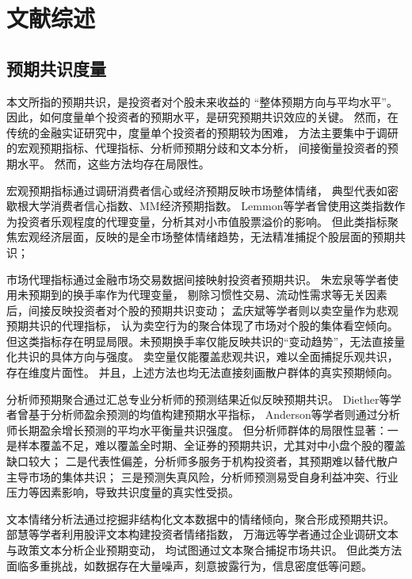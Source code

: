 
\chapter{文献综述}

\section{预期共识度量}
本文所指的预期共识，是投资者对个股未来收益的 “整体预期方向与平均水平”。
因此，如何度量单个投资者的预期水平，是研究预期共识效应的关键。
然而，在传统的金融实证研究中，度量单个投资者的预期较为困难，
方法主要集中于调研的宏观预期指标、代理指标、分析师预期分歧和文本分析\cite{唐国豪2025投资者预期协同}，
间接衡量投资者的预期水平。
然而，这些方法均存在局限性。

宏观预期指标通过调研消费者信心或经济预期反映市场整体情绪，
典型代表如密歇根大学消费者信心指数、MM经济预期指数。
Lemmon等学者曾使用这类指数作为投资者乐观程度的代理变量\cite{lemmon2006consumer}，分析其对小市值股票溢价的影响。
但此类指标聚焦宏观经济层面，反映的是全市场整体情绪趋势，无法精准捕捉个股层面的预期共识；

市场代理指标通过金融市场交易数据间接映射投资者预期共识。
朱宏泉等学者\cite{朱宏泉2016异质信念}使用未预期到的换手率作为代理变量，
剔除习惯性交易、流动性需求等无关因素后，间接反映投资者对个股的预期共识变动；
孟庆斌等学者\cite{孟庆斌2018卖空机制}则以卖空量作为悲观预期共识的代理指标，
认为卖空行为的聚合体现了市场对个股的集体看空倾向。
但这类指标存在明显局限。未预期换手率仅能反映共识的“变动趋势”，无法直接量化共识的具体方向与强度。
卖空量仅能覆盖悲观共识，难以全面捕捉乐观共识，存在维度片面性。
并且，上述方法也均无法直接刻画散户群体的真实预期倾向。

分析师预期聚合通过汇总专业分析师的预测结果近似反映预期共识。
Diether等学者曾基于分析师盈余预测的均值构建预期水平指标\cite{diether2002differences}，
Anderson等学者则通过分析师长期盈余增长预测的平均水平衡量共识强度\cite{anderson2005heterogeneous}。
但分析师群体的局限性显著：一是样本覆盖不足，难以覆盖全时期、全证券的预期共识，尤其对中小盘个股的覆盖缺口较大；
二是代表性偏差，分析师多服务于机构投资者，其预期难以替代散户主导市场的集体共识；
三是预测失真风险，分析师预测易受自身利益冲突、行业压力等因素影响\cite{伍燕然2012分析师预测偏差}，导致共识度量的真实性受损。

文本情绪分析法通过挖掘非结构化文本数据中的情绪倾向，聚合形成预期共识。
部慧等学者利用股评文本构建投资者情绪指数\cite{部慧2018股评投资者情绪}，
万海远等学者通过企业调研文本与政策文本分析企业预期变动\cite{万海远2024税收政策}，
均试图通过文本聚合捕捉市场共识。
但此类方法面临多重挑战，如数据存在大量噪声，刻意披露行为，信息密度低等问题。

